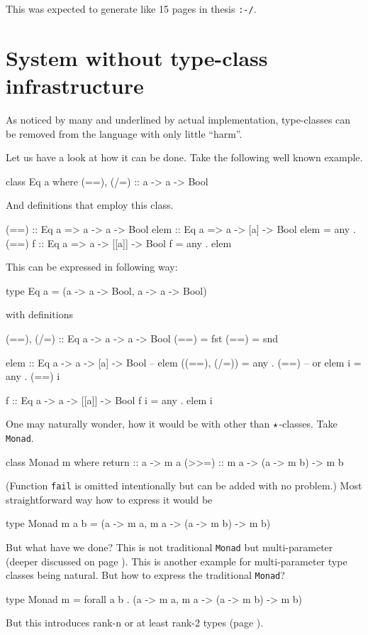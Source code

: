 \documentclass[11pt,oneside,draft]{fithesis2}
\newcommand\uv[1]{``#1''}
\theoremstyle{definition}
\begin{document}
This was expected to generate like 15 pages in thesis \verb~:-/~.

\section{System without type-class infrastructure}

As noticed by many and underlined by actual implementation, type-classes can be removed
from the language with only little \uv{harm}.

Let us have a look at how it can be done. Take the following well known example.
\begin{code}
class Eq a where
    (==), (/=) :: a -> a -> Bool
\end{code}
And definitions that employ this class.
\begin{code}
(==) :: Eq a => a -> a -> Bool
elem :: Eq a => a -> [a] -> Bool
elem = any . (==)
f :: Eq a => a -> [[a]] -> Bool
f = any . elem
\end{code}
This can be expressed in following way:
\begin{code}
type Eq a = (a -> a -> Bool, a -> a -> Bool)
\end{code}
with definitions
\begin{code}
(==), (/=) :: Eq a -> a -> a -> Bool
(==) = fst
(==) = snd

elem :: Eq a -> a -> [a] -> Bool
-- elem ((==), (/=)) = any . (==)
-- or
elem i = any . (==) i

f :: Eq a -> a -> [[a]] -> Bool
f i = any . elem i
\end{code}

One may naturally wonder, how it would be with other than \({\star}\)-classes.
Take \texttt{Monad}.
\begin{code}
class Monad m where
	return :: a -> m a
	(>>=) :: m a -> (a -> m b) -> m b
\end{code}
(Function \texttt{fail} is omitted intentionally but can be added with
no problem.)
Most straightforward way how to express it would be
\begin{code}
type Monad m a b = (a -> m a, m a -> (a -> m b) -> m b)
\end{code}
But what have we done? This is not traditional \texttt{Monad}
but multi-parameter (deeper discussed on page
\pageref{extension:multiparam}). This is another example for
multi-parameter type classes being natural. But how to express the
traditional \texttt{Monad}?
\begin{code}
type Monad m = forall a b . (a -> m a, m a -> (a -> m b) -> m b)
\end{code}
But this introduces rank-n or at least rank-2 types (page
\pageref{extension:rankn}).
\end{document}
